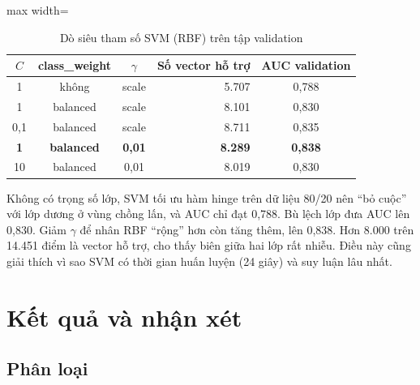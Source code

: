 \begin{table}[H]
\centering
\caption{Dò siêu tham số SVM (RBF) trên tập validation}
\label{tab:svm-grid}
\small
\begin{adjustbox}{max width=\linewidth}
\begin{tabular}{@{}cccrc@{}}
\toprule
$C$ & \textbf{class\_weight} & $\gamma$ & \textbf{Số vector hỗ trợ} & \textbf{AUC validation} \\
\midrule
1 & không & scale & 5.707 & 0,788 \\
1 & balanced & scale & 8.101 & 0,830 \\
0,1 & balanced & scale & 8.711 & 0,835 \\
\textbf{1} & \textbf{balanced} & \textbf{0,01} & \textbf{8.289} & \textbf{0,838} \\
10 & balanced & 0,01 & 8.019 & 0,830 \\
\bottomrule
\end{tabular}
\end{adjustbox}
\end{table}

Không có trọng số lớp, SVM tối ưu hàm hinge trên dữ liệu 80/20 nên ``bỏ cuộc'' với lớp dương ở vùng chồng lấn, và AUC chỉ đạt 0,788. Bù lệch lớp đưa AUC lên 0,830. Giảm $\gamma$ để nhân RBF ``rộng'' hơn còn tăng thêm, lên 0,838. Hơn 8.000 trên 14.451 điểm là vector hỗ trợ, cho thấy biên giữa hai lớp rất nhiễu. Điều này cũng giải thích vì sao SVM có thời gian huấn luyện (24 giây) và suy luận lâu nhất.

\section{Kết quả và nhận xét}
\label{sec:ch2-results}

\subsection{Phân loại}

